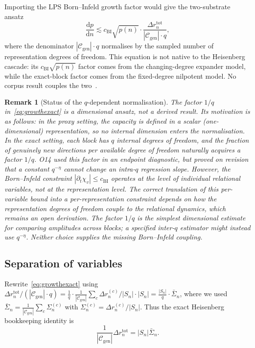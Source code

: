 \documentclass[11pt,a4paper]{article}
\newtheorem{remark}[theorem]{Remark}
\newcommand{\Sn}{\bar{\Sigma}_n}
\begin{document}
Importing the LPS Born--Infeld growth factor would give the two-substrate ansatz
\begin{equation}
\label{eq:growthexact}
\frac{\mathrm{d}p}{\mathrm{d}n}
\lesssim c_{\mathrm{BI}} \sqrt{p(n)} \cdot
\frac{\Delta r_n^{\mathrm{tot}}}{|\mathcal{C}_{\mathrm{gen}}| \cdot q},
\end{equation}
where the denominator $|\mathcal{C}_{\mathrm{gen}}| \cdot q$ normalises by
the sampled number of representation degrees of freedom.
This equation is not native to the Heisenberg cascade: its
$c_{\mathrm{BI}}\sqrt{p(n)}$ factor comes from the changing-degree expander model, while
the exact-block factor comes from the fixed-degree nilpotent model.
No corpus result couples the two~\cite{Beau2026sgn}.

\begin{remark}[Status of the $q$-dependent normalisation]
\label{rem:qnorm}
The factor $1/q$ in~\eqref{eq:growthexact} is a
\emph{dimensional ansatz}, not a derived result.
Its motivation is as follows: in the proxy setting, the capacity
is defined in a scalar (one-dimensional) representation, so no
internal dimension enters the normalisation.
In the exact setting, each block has $q$ internal degrees of
freedom, and the fraction of genuinely new directions per
available degree of freedom naturally acquires a factor $1/q$.
O14 used this factor in an endpoint diagnostic, but proved on revision that a constant
$q^{-\eta}$ cannot change an intra-$q$ regression slope.
However, the Born--Infeld constraint $|\partial_t \chi_v| \leq c_{\mathrm{BI}}$
operates at the level of individual relational variables, not at
the representation level.
The correct translation of this per-variable bound into a
per-representation constraint depends on how the representation
degrees of freedom couple to the relational dynamics,
which remains an open derivation.
The factor $1/q$ is the simplest dimensional estimate for comparing amplitudes across blocks;
a specified inter-$q$ estimator might instead use $q^{-\eta}$.
Neither choice supplies the missing Born--Infeld coupling.
\end{remark}

\subsection{Separation of variables}

Rewrite~\eqref{eq:growthexact} using
$\Delta r_n^{\mathrm{tot}} / (|\mathcal{C}_{\mathrm{gen}}| \cdot q)
= \frac{1}{q} \cdot \frac{1}{|\mathcal{C}_{\mathrm{gen}}|} \sum_c \Delta r_n^{(c)} / |S_n|
\cdot |S_n|
= \frac{|S_n|}{q} \cdot \Sn$,
where we used $\Sn = \frac{1}{|\mathcal{C}_{\mathrm{gen}}|} \sum_c \Sigma_n^{(c)}$
with $\Sigma_n^{(c)} = \Delta r_n^{(c)} / |S_n|$.
Thus the exact Heisenberg bookkeeping identity is
\begin{equation}
\label{eq:growthexact2}
\frac{1}{|\mathcal{C}_{\mathrm{gen}}|}\Delta r_n^{\mathrm{tot}} = |S_n|\Sn.
\end{equation}
\end{document}
